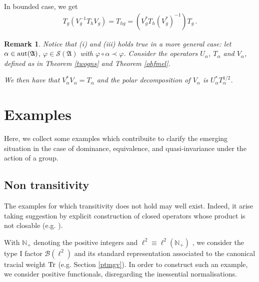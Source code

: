 \documentclass[12pt]{amsart}
\numberwithin{equation}{section}
\def\cb{{\mathcal B}}
\def\cs{{\mathcal S}}
\def\ga{{\mathfrak A}} \def\gpa{{\mathfrak a}}
\def\a{\alpha}
\def\f{\varphi}\def\ff{\phi} \def\F{\Phi}
\newtheorem{rem}[thm]{Remark}
\begin{document}
In bounded case, we get
\begin{eqnarray*}
T_{g}\left(V_{g}^{-1}T_{h}V_{g} \right)=T_{hg}=\left(V_{g}^*T_{h}(V_{g}^*)^{-1}\right)T_{g}\,.
\end{eqnarray*}
\begin{rem}
Notice that (i) and (iii) holds true in a more general case: let $\a\in{\rm aut}(\ga)$, $\f\in\cs(\ga)$ with $\f\circ\a\prec\f$. Consider 
the operators $U_\a$, $T_\a$ and $V_\a$, defined as in Theorem \ref{twogns} and Theorem \ref{ohfmel}. 

We then have that
$V^*_\a V_\a=T_\a$ and the polar decomposition of $V_\a$ is $U^*_\a T^{1/2}_\a$.
\end{rem}



\section{Examples}

Here, we collect some examples which contribuite to clarify the emerging situation in the case of dominance, equivalence, and quasi-invariance under the action of a group.



\subsection{Non transitivity}
\label{maov}

The examples for which transitivity does not hold may well exist. Indeed, it arise taking suggestion by explicit construction of closed operators whose product is not closable (e.g. \cite{Re}).

With $\mathbb N_+$ denoting the positive integers and $\ell^2\equiv \ell^2(\mathbb N_+)$ , we consider the type I factor $\cb(\ell^2)$ and its standard representation associated to the canonical tracial weight ${\rm Tr}$ (e.g. Section \ref{ptmgv}). In order to construct such an example, we consider positive functionals, disregarding the inessential normalisations.
\end{document}
